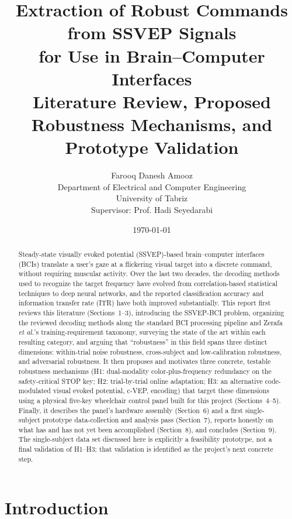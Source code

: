 \documentclass[11pt]{article}
\title{\textbf{Extraction of Robust Commands from SSVEP Signals \\ for Use in Brain--Computer Interfaces} \\[0.3cm]
\large Literature Review, Proposed Robustness Mechanisms, and Prototype Validation}
\author{Farooq Danesh Amooz \\ Department of Electrical and Computer Engineering \\ University of Tabriz \\ \small Supervisor: Prof. Hadi Seyedarabi}
\date{\today}
\begin{document}
\maketitle

\begin{abstract}
\noindent
Steady-state visually evoked potential (SSVEP)-based brain--computer interfaces (BCIs) translate a user's gaze at a flickering visual target into a discrete command, without requiring muscular activity. Over the last two decades, the decoding methods used to recognize the target frequency have evolved from correlation-based statistical techniques to deep neural networks, and the reported classification accuracy and information transfer rate (ITR) have both improved substantially. This report first reviews this literature (Sections~1--3), introducing the SSVEP-BCI problem, organizing the reviewed decoding methods along the standard BCI processing pipeline and Zerafa \textit{et al.}'s training-requirement taxonomy, surveying the state of the art within each resulting category, and arguing that ``robustness'' in this field spans three distinct dimensions: within-trial noise robustness, cross-subject and low-calibration robustness, and adversarial robustness. It then proposes and motivates three concrete, testable robustness mechanisms (H1: dual-modality color-plus-frequency redundancy on the safety-critical STOP key; H2: trial-by-trial online adaptation; H3: an alternative code-modulated visual evoked potential, c-VEP, encoding) that target these dimensions using a physical five-key wheelchair control panel built for this project (Sections~4--5). Finally, it describes the panel's hardware assembly (Section~6) and a first single-subject prototype data-collection and analysis pass (Section~7), reports honestly on what has and has not yet been accomplished (Section~8), and concludes (Section~9). The single-subject data set discussed here is explicitly a feasibility prototype, not a final validation of H1--H3; that validation is identified as the project's next concrete step.
\end{abstract}

\tableofcontents
\newpage

\section{Introduction}
\end{document}
